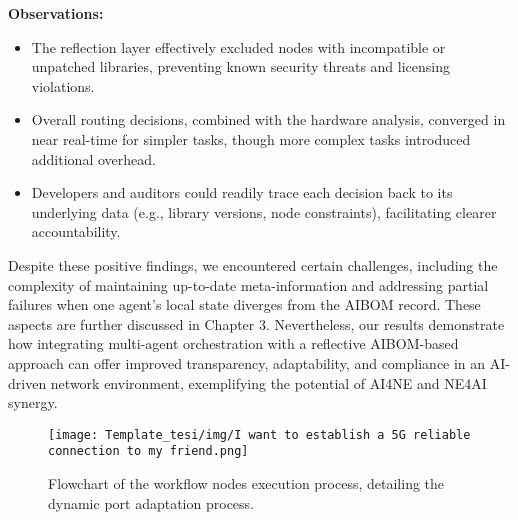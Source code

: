 \textbf{Observations:}
\begin{itemize}[leftmargin=*, label=--]
    \item The reflection layer effectively excluded nodes with incompatible or unpatched libraries, preventing known security threats and licensing violations.
    \item Overall routing decisions, combined with the hardware analysis, converged in near real-time for simpler tasks, though more complex tasks introduced additional overhead.
    \item Developers and auditors could readily trace each decision back to its underlying data (e.g., library versions, node constraints), facilitating clearer accountability.
\end{itemize}


Despite these positive findings, we encountered certain challenges, including the complexity of maintaining up-to-date meta-information and addressing partial failures when one agent’s local state diverges from the AIBOM record. These aspects are further discussed in Chapter 3. Nevertheless, our results demonstrate how integrating multi-agent orchestration with a reflective AIBOM-based approach can offer improved transparency, adaptability, and compliance in an AI-driven network environment, exemplifying the potential of AI4NE and NE4AI synergy.


\begin{figure}[h]
    \centering
    \texttt{[image: Template\_tesi/img/I want to establish a 5G reliable connection to my friend.png]}
    \caption{Flowchart of the workflow nodes execution process, detailing the dynamic port adaptation process.}
    \label{fig:w} 
\end{figure}